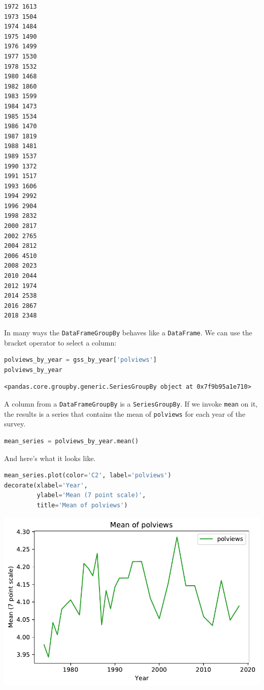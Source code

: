 \begin{lstlisting}[]
1972 1613
1973 1504
1974 1484
1975 1490
1976 1499
1977 1530
1978 1532
1980 1468
1982 1860
1983 1599
1984 1473
1985 1534
1986 1470
1987 1819
1988 1481
1989 1537
1990 1372
1991 1517
1993 1606
1994 2992
1996 2904
1998 2832
2000 2817
2002 2765
2004 2812
2006 4510
2008 2023
2010 2044
2012 1974
2014 2538
2016 2867
2018 2348
\end{lstlisting}

In many ways the \passthrough{\lstinline!DataFrameGroupBy!} behaves like
a \passthrough{\lstinline!DataFrame!}. We can use the bracket operator
to select a column:

\begin{lstlisting}[language=Python]
polviews_by_year = gss_by_year['polviews']
polviews_by_year
\end{lstlisting}

\begin{lstlisting}[]
<pandas.core.groupby.generic.SeriesGroupBy object at 0x7f9b95a1e710>
\end{lstlisting}

A column from a \passthrough{\lstinline!DataFrameGroupBy!} is a
\passthrough{\lstinline!SeriesGroupBy!}. If we invoke
\passthrough{\lstinline!mean!} on it, the results is a series that
contains the mean of \passthrough{\lstinline!polviews!} for each year of
the survey.

\begin{lstlisting}[language=Python]
mean_series = polviews_by_year.mean()
\end{lstlisting}

And here's what it looks like.

\begin{lstlisting}[language=Python]
mean_series.plot(color='C2', label='polviews')
decorate(xlabel='Year', 
         ylabel='Mean (7 point scale)',
         title='Mean of polviews')
\end{lstlisting}

\begin{center}
\includegraphics[scale=0.75]{02_polviews_files/02_polviews_46_0.pdf}
\end{center}

